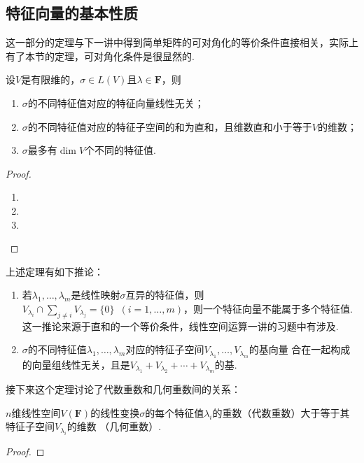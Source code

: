 \subsection{特征向量的基本性质}
这一部分的定理与下一讲中得到简单矩阵的可对角化的等价条件直接相关，实际上有了本节的定理，可对角化条件是很显然的.
\begin{theorem}
	设$V$是有限维的，$\sigma\in L(V)$且$\lambda\in\mathbf{F}$，则
	\begin{enumerate}[label=(\arabic*)]
        \item $\sigma$的不同特征值对应的特征向量线性无关；
        \item $\sigma$的不同特征值对应的特征子空间的和为直和，且维数直和小于等于$V$的维数；
        \item $\sigma$最多有$\dim V$个不同的特征值.
    \end{enumerate}
\end{theorem}
\begin{proof}
    \begin{enumerate}[label=(\arabic*)]
        \item 
        \item 
        \item 
    \end{enumerate}
\end{proof}

上述定理有如下推论：
\begin{enumerate}
    \item 若$\lambda_1,\ldots,\lambda_m$是线性映射$\sigma$互异的特征值，则$V_{\lambda_i}\cap\sum\limits_{j\neq i}V_{\lambda_j}=\{0\}
    \enspace(i=1,\ldots,m)$，则一个特征向量不能属于多个特征值.这一推论来源于直和的一个等价条件，线性空间运算一讲的习题中有涉及.

    \item $\sigma$的不同特征值$\lambda_1,\ldots,\lambda_m$对应的特征子空间$V_{\lambda_1},\ldots,V_{\lambda_m}$的基向量
    合在一起构成的向量组线性无关，且是$V_{\lambda_1}+V_{\lambda_2}+\cdots+V_{\lambda_m}$的基.
\end{enumerate}

接下来这个定理讨论了代数重数和几何重数间的关系：
\begin{theorem}\label{thm:18:代数重数与几何重数}
    $n$维线性空间$V(\mathbf{F})$的线性变换$\sigma$的每个特征值$\lambda_i$的重数（代数重数）大于等于其特征子空间$V_{\lambda_i}$的维数
    （几何重数）.
\end{theorem}
\begin{proof}
    
\end{proof}

